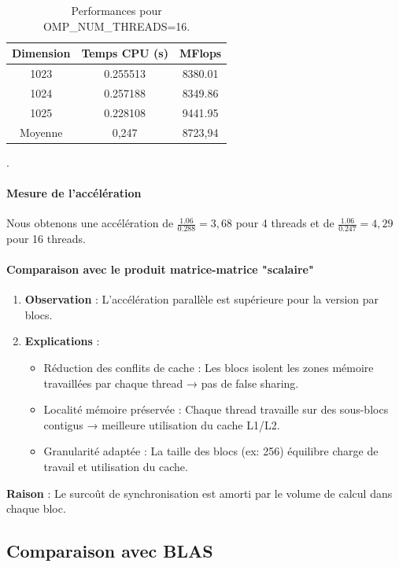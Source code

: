 \documentclass[a4paper,13pt]{book}
\begin{document}
\begin{table}[h!]
    \begin{center}
    \begin{tabular}{|c|c|c|}
        \hline
        Dimension & Temps CPU (s) & MFlops \\ \hline
        1023      & 0.255513       & 8380.01 \\ \hline
        1024      & 0.257188       &  8349.86 \\ \hline
        1025      & 0.228108        & 9441.95 \\ \hline
        Moyenne      & 0,247        & 8723,94 \\ \hline
    \end{tabular}
    \caption{Performances pour OMP\_NUM\_THREADS=16.}
\end{center}
\end{table}.

\paragraph{Mesure de l'accélération}
 Nous obtenons une accélération de \textbf{$\frac{1.06}{0.288}=3,68$} pour 4 threads et de \textbf{$\frac{1.06}{0.247}=4,29$} pour 16 threads.
\paragraph{Comparaison avec le produit matrice-matrice "scalaire"}
\begin{enumerate}
\item \textbf{ Observation} :
L'accélération parallèle est supérieure pour la version par blocs.
\item \textbf{Explications }:
    \begin{itemize}
    \item Réduction des conflits de cache : Les blocs isolent les zones mémoire travaillées par chaque thread → pas de false sharing.
    \item Localité mémoire préservée : Chaque thread travaille sur des sous-blocs contigus → meilleure utilisation du cache L1/L2.
    \item Granularité adaptée : La taille des blocs (ex: 256) équilibre charge de travail et utilisation du cache.
    \end{itemize}
\end{enumerate}
\textbf{Raison }:
Le surcoût de synchronisation est amorti par le volume de calcul dans chaque bloc.
 \subsection{Comparaison avec BLAS} 
\end{document}
